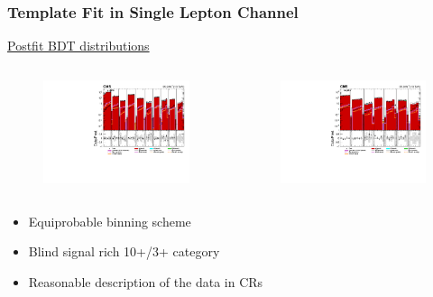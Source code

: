 \documentclass{beamer}
\begin{document}
\begin{frame}
\frametitle{Template Fit in Single Lepton Channel}
\underline{Postfit BDT distributions} \vspace{-10pt}
\begin{columns}
	\begin{figure}
		\includegraphics[width=\linewidth]{large_stat/mu/hist_muall_origbin_pub_lin}
	\end{figure}
	\begin{figure}
		\includegraphics[width=\linewidth]{large_stat/el/hist_elall_origbin_pub_lin}
	\end{figure}
\end{columns}
	\begin{itemize}
	\item Equiprobable binning scheme
	\item Blind signal rich 10+/3+ category
	\item Reasonable description of the data in CRs
	\end{itemize}
\end{frame}
\end{document}
